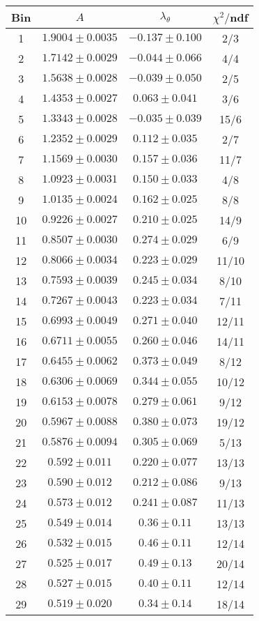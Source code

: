 \begin{tabular}{c|c|c|c}
Bin & $A$ & $\lambda_\theta$ & $\chi^2/$ndf \\
\hline
1 & $1.9004\pm0.0035$ & $-0.137\pm0.100$ & 2/3 \\
2 & $1.7142\pm0.0029$ & $-0.044\pm0.066$ & 4/4 \\
3 & $1.5638\pm0.0028$ & $-0.039\pm0.050$ & 2/5 \\
4 & $1.4353\pm0.0027$ & $0.063\pm0.041$ & 3/6 \\
5 & $1.3343\pm0.0028$ & $-0.035\pm0.039$ & 15/6 \\
6 & $1.2352\pm0.0029$ & $0.112\pm0.035$ & 2/7 \\
7 & $1.1569\pm0.0030$ & $0.157\pm0.036$ & 11/7 \\
8 & $1.0923\pm0.0031$ & $0.150\pm0.033$ & 4/8 \\
9 & $1.0135\pm0.0024$ & $0.162\pm0.025$ & 8/8 \\
10 & $0.9226\pm0.0027$ & $0.210\pm0.025$ & 14/9 \\
11 & $0.8507\pm0.0030$ & $0.274\pm0.029$ & 6/9 \\
12 & $0.8066\pm0.0034$ & $0.223\pm0.029$ & 11/10 \\
13 & $0.7593\pm0.0039$ & $0.245\pm0.034$ & 8/10 \\
14 & $0.7267\pm0.0043$ & $0.223\pm0.034$ & 7/11 \\
15 & $0.6993\pm0.0049$ & $0.271\pm0.040$ & 12/11 \\
16 & $0.6711\pm0.0055$ & $0.260\pm0.046$ & 14/11 \\
17 & $0.6455\pm0.0062$ & $0.373\pm0.049$ & 8/12 \\
18 & $0.6306\pm0.0069$ & $0.344\pm0.055$ & 10/12 \\
19 & $0.6153\pm0.0078$ & $0.279\pm0.061$ & 9/12 \\
20 & $0.5967\pm0.0088$ & $0.380\pm0.073$ & 19/12 \\
21 & $0.5876\pm0.0094$ & $0.305\pm0.069$ & 5/13 \\
22 & $0.592\pm0.011$ & $0.220\pm0.077$ & 13/13 \\
23 & $0.590\pm0.012$ & $0.212\pm0.086$ & 9/13 \\
24 & $0.573\pm0.012$ & $0.241\pm0.087$ & 11/13 \\
25 & $0.549\pm0.014$ & $0.36\pm0.11$ & 13/13 \\
26 & $0.532\pm0.015$ & $0.46\pm0.11$ & 12/14 \\
27 & $0.525\pm0.017$ & $0.49\pm0.13$ & 20/14 \\
28 & $0.527\pm0.015$ & $0.40\pm0.11$ & 12/14 \\
29 & $0.519\pm0.020$ & $0.34\pm0.14$ & 18/14 \\
\end{tabular}
